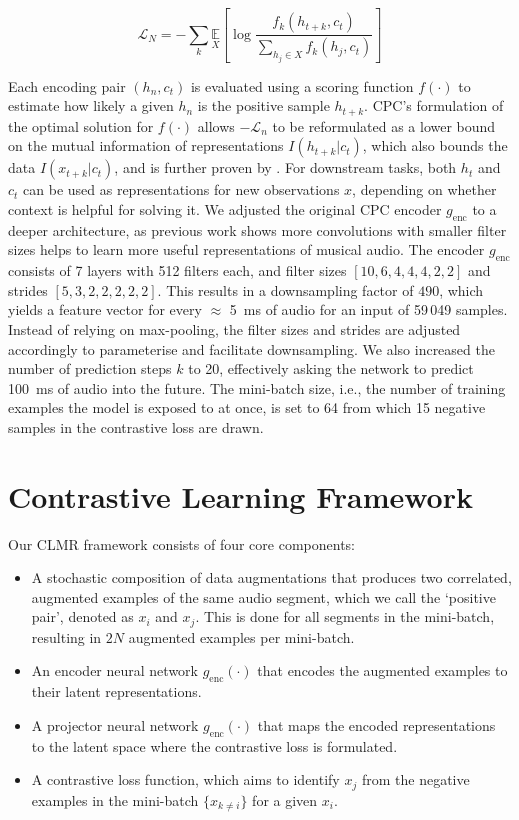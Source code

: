 \documentclass{report}
\begin{document}
\begin{equation}
    \mathcal{L}_{N}=-\sum_{k} \underset{X}{\mathbb{E}}\left[\log \frac{f_{k}\left(h_{t+k}, c_{t}\right)}{\sum_{h_{j} \in X} f_{k}\left(h_{j}, c_{t}\right)}\right]
\end{equation}

Each encoding pair $(h_n, c_t)$ is evaluated using a scoring function $f(\cdot)$ to estimate how likely a given $h_n$ is the positive sample $h_{t+k}$. CPC's \cite{oord_representation_2019} formulation of the optimal solution for $f(\cdot)$ allows $-\mathcal{L}_n$ to be reformulated as a lower bound on the mutual information of representations $I(h_{t+k} | c_t)$, which also bounds the data $I(x_{t+k} | c_t)$, and is further proven by \cite{poole_variational_2019}. For downstream tasks, both $h_t$ and $c_t$ can be used as representations for new observations $x$, depending on whether context is helpful for solving it. We adjusted the original CPC encoder $g_{\mathrm{enc}}$ to a deeper architecture, as previous work\cite{lee2018samplecnn} shows more convolutions with smaller filter sizes helps to learn more useful representations of musical audio. The encoder $g_{\mathrm{enc}}$ consists of 7 layers with 512 filters each, and filter sizes $[10, 6, 4, 4, 4, 2, 2]$ and strides $[5, 3, 2, 2, 2, 2, 2]$. This results in a downsampling factor of $490$, which yields a feature vector for every $\approx$ 5~ms of audio for an input of 59\,049 samples. Instead of relying on max-pooling, the filter sizes and strides are adjusted accordingly to parameterise and facilitate downsampling. We also increased the number of prediction steps $k$ to 20, effectively asking the network to predict 100~ms of audio into the future. The mini-batch size, i.e., the number of training examples the model is exposed to at once, is set to 64 from which 15 negative samples in the contrastive loss are drawn.


\section{Contrastive Learning Framework}
Our CLMR framework consists of four core components:
\begin{itemize}
    \item A stochastic composition of data augmentations that produces two correlated, augmented examples of the same audio segment, which we call the `positive pair', denoted as $x_i$ and $x_j$. This is done for all segments in the mini-batch, resulting in $2N$ augmented examples per mini-batch.
    \item An encoder neural network $g_{\mathrm{enc}}(\cdot)$ that encodes the augmented examples to their latent representations.
    \item A projector neural network $g_{\mathrm{enc}}(\cdot)$ that maps the encoded representations to the latent space where the contrastive loss is formulated.
    \item A contrastive loss function, which aims to identify $x_j$ from the negative examples in the mini-batch $\{x_{k\neq i}\}$ for a given $x_i$.
\end{itemize}
\end{document}
